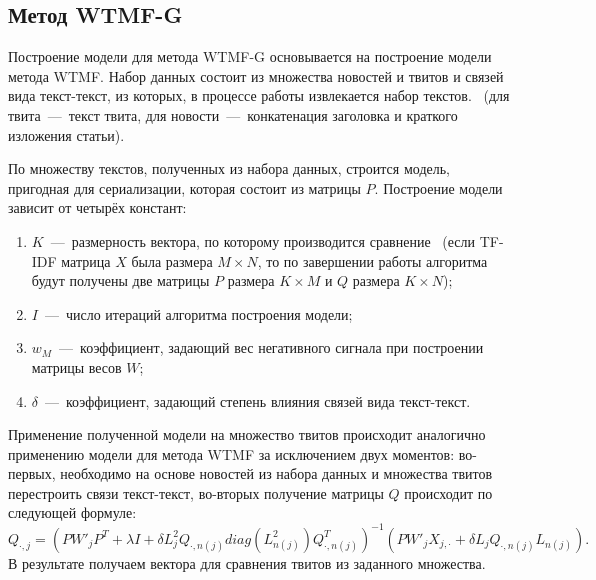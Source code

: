 \subsection{Метод WTMF-G}
    Построение модели для метода WTMF-G основывается на построение модели метода WTMF.
    Набор данных состоит из множества новостей и твитов и связей вида текст-текст, из которых, в процессе работы извлекается набор текстов.
    ~(для твита~---~текст твита, для новости~---~конкатенация заголовка и краткого изложения статьи).

    По множеству текстов, полученных из набора данных, строится модель, пригодная для сериализации, которая состоит из матрицы $P$.
    Построение модели зависит от четырёх констант:
    \begin{enumerate}
        \item $K$~---~размерность вектора, по которому производится сравнение~
        (если TF-IDF матрица $X$ была размера $M \times N$, то по завершении работы алгоритма будут получены две матрицы $P$ размера $K \times M$ и $Q$ размера $K \times N$);
        \item $I$~---~число итераций алгоритма построения модели;
        \item $w_M$~---~коэффициент, задающий вес негативного сигнала при построении матрицы весов $W$;
        \item $\delta$~---~коэффициент, задающий степень влияния связей вида текст-текст.
    \end{enumerate}

    Применение полученной модели на множество твитов происходит аналогично применению модели для метода WTMF за исключением двух моментов:
    во-первых, необходимо на основе новостей из набора данных и множества твитов перестроить связи текст-текст, во-вторых получение матрицы $Q$ происходит по следующей формуле:
    $$Q_{\cdot, j} = (P W'_j P^T + \lambda I + \delta  L_j^2 Q_{\cdot,n(j)} diag(L^2_{n(j)})Q_{\cdot,n(j)}^T)^{-1}   (P W'_j X_{j,\cdot} + \delta  L_j Q_{\cdot,n(j)} L_{n(j)}).$$
    В результате получаем вектора для сравнения твитов из заданного множества.